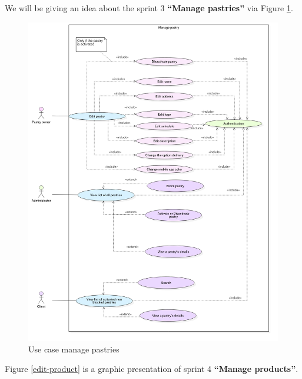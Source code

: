 \documentclass[12pt,a4paper]{report}
\begin{document}
We will be giving an idea about the sprint 3 \textbf{``Manage pastries''} via Figure \ref{edit-pastry}.
\begin{figure}[H]
	\centering
	\includegraphics[width=7.2in,keepaspectratio]{editPastry.png}
	\caption{Use case manage pastries}
	\label{edit-pastry}
\end{figure}
Figure \ref{edit-product} is a graphic presentation of sprint 4 \textbf{``Manage products''}.
\end{document}
